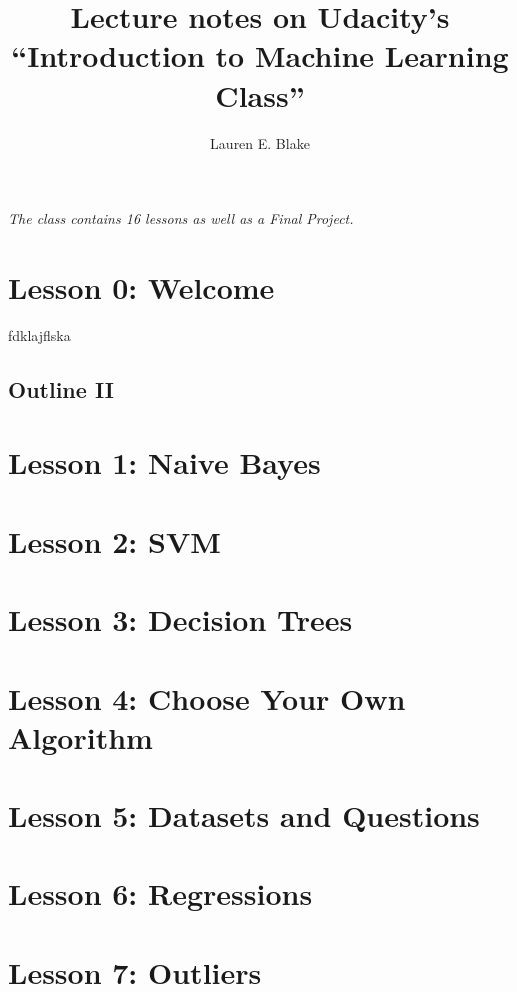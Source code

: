 \documentclass{article}
\begin{document}
\title{Lecture notes on Udacity's ``Introduction to Machine Learning Class''}
\author{Lauren E. Blake}

\maketitle

\begin{flushleft}
\Large{\textit{The class contains 16 lessons as well as a Final Project.}}
\end{flushleft}

\section{Lesson 0: Welcome}

fdklajflska


\subsection{Outline II}

\section{Lesson 1: Naive Bayes}


\section{Lesson 2: SVM}

\section{Lesson 3: Decision Trees}

\section{Lesson 4: Choose Your Own Algorithm}

\section{Lesson 5: Datasets and Questions}

\section{Lesson 6: Regressions}

\section{Lesson 7: Outliers}
\end{document}
